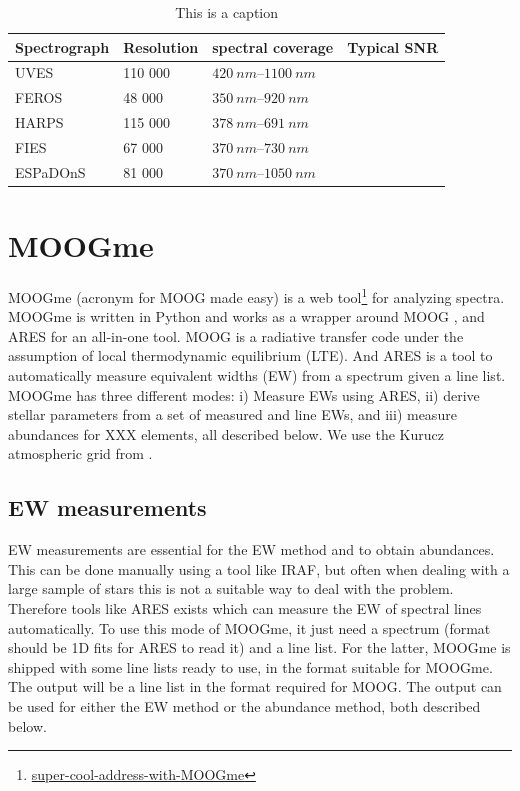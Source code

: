 \documentclass{aa}
\begin{document}
\begin{table}[htb!]
    \caption{This is a caption}
    \label{tab:instruments}
    \centering
    \begin{tabular}{llll}
      \hline\hline
      Spectrograph & Resolution & spectral coverage           & Typical SNR \\
      \hline
      UVES         &    110 000 & $\SIrange{420}{1100}{nm}$   &             \\
      FEROS        &     48 000 & $\SIrange{350}{920}{nm}$    &             \\
      HARPS        &    115 000 & $\SIrange{378}{691}{nm}$    &             \\
      FIES         &     67 000 & $\SIrange{370}{730}{nm}$    &             \\
      ESPaDOnS     &     81 000 & $\SIrange{370}{1050}{nm}$   &             \\
      \hline
    \end{tabular}
\end{table}




\section{MOOGme}
\label{sec:MOOGme}
MOOGme (acronym for MOOG made easy) is a web tool\footnote{\url{super-cool-address-with-MOOGme}}
for analyzing spectra. MOOGme is written in Python and works as a wrapper around MOOG
\citep{Sneden1973}, and ARES \citep{Sousa2015a} for an all-in-one tool.
MOOG is a radiative transfer code under the assumption of local
thermodynamic equilibrium (LTE). And ARES is a tool to automatically measure equivalent
widths (EW) from a spectrum given a line list. MOOGme has
three different modes: i) Measure EWs using ARES, ii) derive stellar parameters
from a set of measured  and  line EWs, and iii)
measure abundances for XXX elements, all described below. We use the Kurucz atmospheric grid from
\citet{Kurucz1993}.


\subsection{EW measurements}
\label{sub:EW_measurements}
EW measurements are essential for the EW method and to obtain abundances. This
can be done manually using a tool like IRAF, but often when dealing with a large
sample of stars this is not a suitable way to deal with the problem. Therefore
tools like ARES exists which can measure the EW of spectral lines automatically.
To use this mode of MOOGme, it just need a spectrum (format should be 1D fits
for ARES to read it) and a line
list. For the latter, MOOGme is shipped with some line lists ready to use, in
the format suitable for MOOGme. The output will be a line list in the format
required for MOOG. The output can be used for either the EW method or the
abundance method, both described below.
\end{document}
